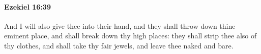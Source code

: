 
		\paragraph{Ezekiel 16:39} %
			\label{EZEKIEL-16-39}

			And I will also give thee into their hand, and they shall throw down thine eminent place, and shall break down thy high places: they shall strip thee also of thy clothes, and shall take thy fair jewels, and leave thee naked and bare.


